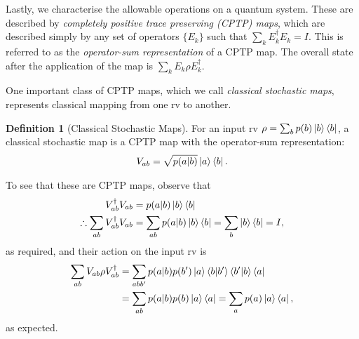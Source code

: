 \documentclass[10pt, a4paper]{article}
\numberwithin{equation}{section} %
\newcounter{stmt} %
\theoremstyle{definition}
\newtheorem{defn}[stmt]{Definition}
\theoremstyle{plain}
\newcommand{\?}{\mathrel{?}} %
\begin{document}
\begin{appendices}
                    Lastly, we characterise the allowable operations on a quantum system. These are described by \emph{completely positive trace preserving (CPTP) maps}, which are described simply by any set of operators \(\{E_k\}\) such that \(\sum_k E_k^{\dagger}E_k = I\). This is referred to as the \emph{operator-sum representation} of a CPTP map. The overall state after the application of the map is \(\sum_k E_k \rho E_k^{\dagger}\).

                    One important class of CPTP maps, which we call \emph{classical stochastic maps}, represents classical mapping from one rv to another. 
                    \begin{defn}[Classical Stochastic Maps]\label{def:classop}
                      For an input rv \(\rho = \sum_b p(b)\ket{b}\bra{b}\), a classical stochastic map is a CPTP map with the operator-sum representation:
                    \begin{align*}
                      V_{ab} = \sqrt{p(a|b)}\ket{a}\bra{b}.
                    \end{align*}
                  \end{defn}
                  To see that these are CPTP maps, observe that
                  \begin{align*}
                    V_{ab}^{\dagger}V_{ab} &= p(a|b)\ket{b}\bra{b} \\
                    \therefore \sum_{ab} V_{ab}^{\dagger}V_{ab} &= \sum_{ab} p(a|b)\ket{b}\bra{b} = \sum_{b} \ket{b}\bra{b} = I,
                  \end{align*}
                  as required, and their action on the input rv is
                  \begin{align*}
                    \sum_{ab} V_{ab}\rho V_{ab}^{\dagger} &= \sum_{abb'} p(a|b)p(b') \ket{a}\braket{b|b'}\braket{b'|b}\bra{a}  \\
                                                          &= \sum_{ab} p(a|b)p(b) \ket{a}\bra{a} = \sum_{a} p(a) \ket{a}\bra{a},
                  \end{align*}
                  as expected.


\end{appendices}
\end{document}
